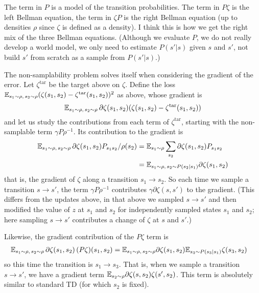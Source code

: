 \documentclass[11pt,a4paper]{article}
\newcommand{\zetatar}{\zeta^\mathrm{tar}}
\begin{document}
The term in $P$ is a model of the transition probabilities. The term in
$P\zeta$ is the left Bellman equation, the term in $\zeta P$ is the right
Bellman equation (up to densities $\rho$ since $\zeta$ is defined as a
density). I think this is how we get the right mix of the three Bellman
equations. (Although we evaluate $P$, we do not really develop a world
model, we only need to estimate $P(s'|s)$ given $s$ and $s'$, not build
$s'$ from scratch as a sample from $P(s'|s)$.)

The non-samplability problem solves itself when considering the gradient of the
error. Let $\zetatar$ be the target above on $\zeta$. Define the loss
$\E_{s_1\sim \rho,\,s_2\sim \rho} (\zeta(s_1,s_2)-\zetatar(s_1,s_2))^2$
as above, whose gradient is
\begin{equation}
\E_{s_1\sim \rho,\,s_2\sim \rho} \,\partial \zeta(s_1,s_2)(\zeta(s_1,s_2)-\zetatar(s_1,s_2))
\end{equation}
and let us study the contributions from each term of $\zetatar$, starting
with the non-samplable term $\gamma P \rho^{-1}$. Its contribution to the
gradient is
\begin{align}
\mathbb{E}_{s_1\sim \rho,\,s_2\sim \rho} \,\partial \zeta(s_1,s_2)
P_{s_1s_2}/\rho(s_2)&=\mathbb{E}_{s_1\sim \rho}\sum_{s_2} \partial
\zeta(s_1,s_2)P_{s_1s_2}
\\&=\mathbb{E}_{s_1\sim \rho,\,s_2\sim P(s_2|s_1)}\partial
\zeta(s_1,s_2)
\end{align}
that is, the gradient of $\zeta$ along a transition $s_1\to s_2$.
So each time we sample a transition $s\to s'$, the term $
\gamma P\rho^{-1}$ contributes $\gamma \partial
\zeta(s,s')$ to the gradient. (This differs from the updates above, in
that above we sampled $s\to s'$ and then modified the value of $z$ at
$s_1$ and $s_2$ for independently sampled states $s_1$ and $s_2$; here
sampling $s\to s'$ contributes a change of $\zeta$ at $s$ and $s'$.)

Likewise, the gradient contribution of the $P\zeta$ term is
\begin{align}
\mathbb{E}_{s_1\sim \rho,\,s_2\sim \rho} \,\partial \zeta(s_1,s_2)
\,(P\zeta)(s_1,s_2)&=\mathbb{E}_{s_1\sim \rho,\,s_2\sim \rho}
\partial \zeta(s_1,s_2)\mathbb{E}_{s_3\sim P(s_3|s_1)}\zeta(s_3,s_2)
\end{align}
so this time the transition is $s_1\to s_3$. That is, when we sample a
transition $s\to s'$, we have a gradient term $\mathbb{E}_{s_2\sim \rho}
\partial\zeta(s,s_2)\zeta(s',s_2)$. This term is absolutely similar to
standard TD (for which $s_2$ is fixed).
\end{document}
